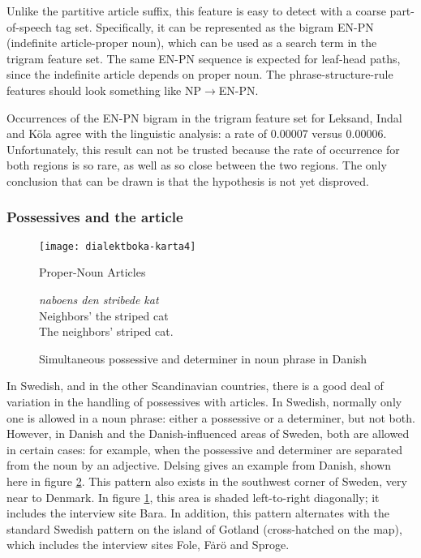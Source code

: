 Unlike the partitive article suffix, this feature is easy to detect
with a coarse part-of-speech tag set. Specifically, it can be represented as the
bigram EN-PN (indefinite article-proper noun), which can be used as a
search term in the trigram feature set. The same EN-PN sequence is
expected for leaf-head paths, since the indefinite article depends on
proper noun. The phrase-structure-rule features should
look something like NP$\to$EN-PN.

Occurrences of the EN-PN bigram in the trigram feature set for
Leksand, Indal and K\"ola agree with the linguistic analysis: a rate
of 0.00007 versus 0.00006. Unfortunately, this result can not be
trusted because the rate of occurrence for both regions is so rare, as
well as so close between the two regions. The only conclusion that can
be drawn is that the hypothesis is not yet disproved.

\subsubsection{Possessives and the article}

\begin{figure}
  \texttt{[image: dialektboka-karta4]}
  \caption{Proper-Noun Articles}
  \label{possessive-plus-article-map}
\end{figure}

\begin{figure}
  {\it naboens den stribede kat} \\
  Neighbors' the striped cat \\
  The neighbors' striped cat.
  \caption{Simultaneous possessive and determiner in noun phrase in
    Danish}
  \label{possessive-plus-article-example}
\end{figure}

In Swedish, and in the other Scandinavian countries, there is a good
deal of variation in the handling of possessives with articles. In
Swedish, normally only one is allowed in a noun phrase: either a
possessive or a determiner, but not both. However, in Danish and the
Danish-influenced areas of Sweden, both are allowed in certain cases:
for example, when the possessive and determiner are separated from the
noun by an adjective. Delsing gives an example from Danish, shown here
in figure \ref{possessive-plus-article-example}.  This pattern also
exists in the southwest corner of Sweden, very near to Denmark. In
figure \ref{possessive-plus-article-map}, this area is shaded
left-to-right diagonally; it includes the interview site Bara. In
addition, this pattern alternates with the standard Swedish pattern on
the island of Gotland (cross-hatched on the map), which includes the
interview sites Fole, F\.ar\"o and Sproge.

